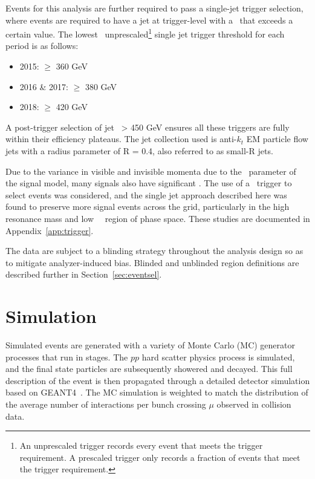 Events for this analysis are further required to pass a single-jet trigger selection, where events are required to have a jet at trigger-level with a \pt~that exceeds a certain value. 
The lowest \pt~unprescaled\footnote{An unprescaled trigger records every event that meets the trigger requirement. A prescaled trigger only records a fraction of events that meet the trigger requirement.} single jet trigger threshold for each period is as follows: 

\begin{itemize}
\item 2015: \pt $\geq$ 360 GeV
\item 2016 \& 2017:  \pt $\geq$ 380 GeV
\item 2018:  \pt $\geq$ 420 GeV
\end{itemize}

A post-trigger selection of jet \pt~> 450 GeV ensures all these triggers are fully within their efficiency plateaus. The jet collection used is anti-$k_t$ EM particle flow jets with a radius parameter of R = 0.4, also referred to as small-R jets. \par

Due to the variance in visible and invisible momenta due to the \rinv~parameter of the signal model, many signals also have significant \met.
The use of a \met~trigger to select events was considered, and the single jet approach described here was found to preserve more signal events across the grid, particularly in the high resonance mass and low ~\rinv~region of phase space. These studies are documented in Appendix~\ref{app:trigger}.\par

The data are subject to a blinding strategy throughout the analysis design so as to mitigate analyzer-induced bias. 
Blinded and unblinded region definitions are described further in Section~\ref{sec:eventsel}.

\section{Simulation}
\label{sec:simulation}

Simulated events are generated with a variety of Monte Carlo (MC) generator processes that run in stages. The $pp$ hard scatter physics process is simulated, and the final state particles are subsequently showered and decayed. This full description of the event is then propagated through a detailed detector simulation based on GEANT4~\cite{Agostinelli:2002hh}. The MC simulation is weighted to match the distribution of the average number of interactions per bunch crossing $\mu$ observed in collision data.\par

